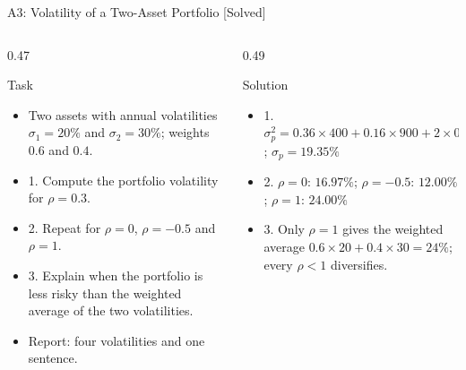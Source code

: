 \begin{frame}{A3: Volatility of a Two-Asset Portfolio [Solved]}
\itemsize{\footnotesize}
\begin{columns}[T]
\begin{column}{0.47\textwidth}
\begin{block}{Task}
\begin{itemize}
    \item Two assets with annual volatilities $\sigma_1 = 20\%$ and $\sigma_2 = 30\%$; weights $0.6$ and $0.4$.
    \item 1. Compute the portfolio volatility for $\rho = 0.3$.
    \item 2. Repeat for $\rho = 0$, $\rho = -0.5$ and $\rho = 1$.
    \item 3. Explain when the portfolio is less risky than the weighted average of the two volatilities.
    \item Report: four volatilities and one sentence.
\end{itemize}
\end{block}
\end{column}
\begin{column}{0.49\textwidth}
\begin{exampleblock}{Solution}
\begin{itemize}
    \item 1. $\sigma_p^2 = 0.36 \times 400 + 0.16 \times 900 + 2 \times 0.24 \times 0.3 \times 600 = 374.4$; $\sigma_p = 19.35\%$
    \item 2. $\rho = 0$: $16.97\%$; $\rho = -0.5$: $12.00\%$; $\rho = 1$: $24.00\%$
    \item 3. Only $\rho = 1$ gives the weighted average $0.6 \times 20 + 0.4 \times 30 = 24\%$; every $\rho < 1$ diversifies.
\end{itemize}
\end{exampleblock}
\end{column}
\end{columns}
\end{frame}

